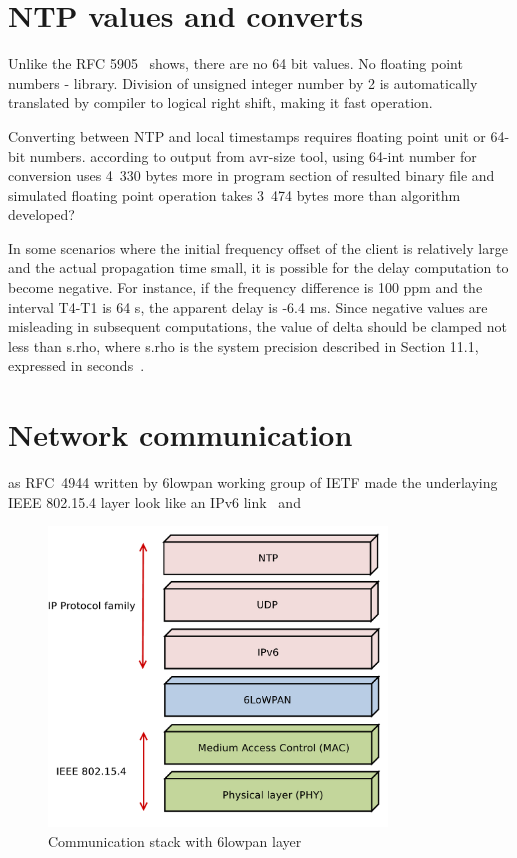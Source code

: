 

\section{NTP values and converts}
Unlike the RFC 5905~\cite{rfc5905} shows, there are no 64 bit values. %
No floating point numbers - library.
Division of unsigned integer number by 2 is automatically translated by compiler to logical right shift,
making it fast operation.

Converting between NTP and local timestamps requires floating point unit or 64-bit numbers.
according to output from avr-size tool, using 64-int number for conversion
uses 4~330 bytes more in program section of resulted binary file 
and simulated floating point operation takes 3~474 bytes more
than algorithm developed?

%
In some scenarios where the initial frequency offset of the client is
  relatively large and the actual propagation time small, it is
   possible for the delay computation to become negative.  For instance,
   if the frequency difference is 100 ppm and the interval T4-T1 is 64
   s, the apparent delay is -6.4 ms.  Since negative values are
   misleading in subsequent computations, the value of delta should be
   clamped not less than s.rho, where s.rho is the system precision
   described in Section 11.1, expressed in seconds~\cite{rfc5905}.
%

\section{Network communication}
as RFC~4944 written by 6lowpan working group of IETF
made the underlaying IEEE 802.15.4 layer
look like an IPv6 link~\cite{6lowpan} and
\begin{figure}
  \centering
  \includegraphics[width=9cm,keepaspectratio]{fig/6lowpan.pdf}
  \caption{Communication stack with 6lowpan layer}
  \label{fig:implementation-6lowpan}
  \bigskip
\end{figure}

